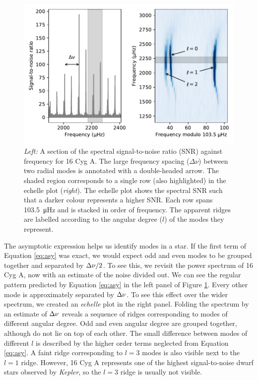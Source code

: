 \begin{figure}[tb]
    \centering
    \includegraphics{figures/seismo-echelle.pdf}
    \caption{\emph{Left:} A section of the spectral signal-to-noise ratio (SNR) against frequency for 16 Cyg A. The large frequency spacing (\(\Delta\nu\)) between two radial modes is annotated with a double-headed arrow. The shaded region corresponds to a single row (also highlighted) in the echelle plot (\emph{right}). The echelle plot shows the spectral SNR such that a darker colour represents a higher SNR. Each row spans \SI{103.5}{\micro\hertz} and is stacked in order of frequency. The apparent ridges are labelled according to the angular degree (\(l\)) of the modes they represent.}
    \label{fig:seismo-echelle}
\end{figure}

The asymptotic expression helps us identify modes in a star. If the first term of Equation \ref{eq:asy} was exact, we would expect odd and even modes to be grouped together and separated by \({\Delta\nu}/2\). To see this, we revisit the power spectrum of 16 Cyg A, now with an estimate of the noise divided out. We can see the regular pattern predicted by Equation \ref{eq:asy} in the left panel of Figure \ref{fig:seismo-echelle}. Every other mode is approximately separated by \({\Delta\nu}\). To see this effect over the wider spectrum, we created an \emph{echelle} plot in the right panel. Folding the spectrum by an estimate of \({\Delta\nu}\) reveals a sequence of ridges corresponding to modes of different angular degree. Odd and even angular degree are grouped together, although do not lie on top of each other. The small difference between modes of different \(l\) is described by the higher order terms neglected from Equation \ref{eq:asy}. A faint ridge corresponding to \(l=3\) modes is also visible next to the \(l=1\) ridge. However, 16 Cyg A represents one of the highest signal-to-noise dwarf stars observed by \emph{Kepler}, so the \(l=3\) ridge is usually not visible. 

